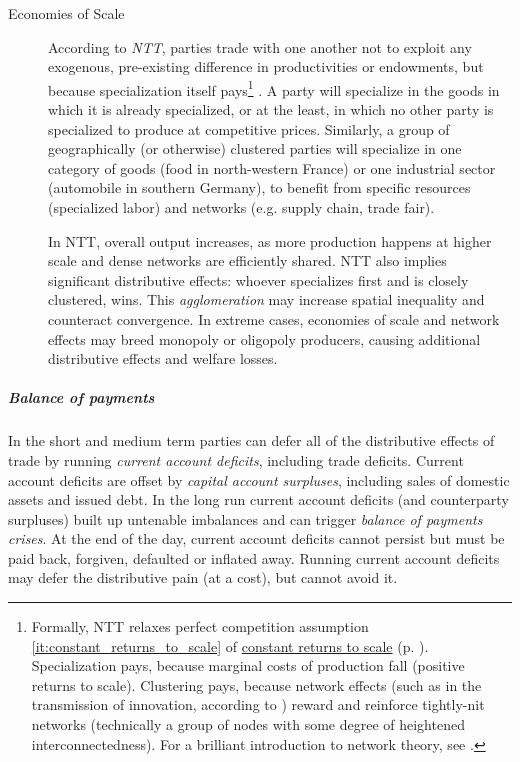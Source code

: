 \begin{description}
	\item[Economies of Scale] \label{it:NTT} According to \emph{\gls{NTT}}, parties trade with one another not to exploit any exogenous, pre-existing difference in productivities or endowments, but because specialization itself pays\footnote{
		Formally, \gls{NTT} relaxes perfect competition assumption \ref{it:constant_returns_to_scale} of \hyperref[it:constant_returns_to_scale]{constant returns to scale} (p. \pageref{it:constant_returns_to_scale}). Specialization pays, because marginal costs of production fall (positive returns to scale). Clustering pays, because network effects (such as in the transmission of innovation, according to \citealt{Bass1969}) reward and reinforce tightly-nit networks (technically a group of nodes with some degree of heightened interconnectedness). For a brilliant introduction to network theory, see \cite{Kleinberg-2009-oz}.} 
	\citep{Krugman-1980-aa}. A party will specialize in the goods in which it is already specialized, or at the least, in which no other party is specialized to produce at competitive prices. Similarly, a group of geographically (or otherwise) clustered parties will specialize in one category of goods (food in north-western France) or one industrial sector (automobile in southern Germany), to benefit from specific resources (specialized labor) and networks (e.g. supply chain, trade fair).

	In \gls{NTT}, overall output increases, as more production happens at higher scale and dense networks are efficiently shared. \gls{NTT} also implies significant distributive effects: whoever specializes first and is closely clustered, wins. This \emph{agglomeration} may increase spatial inequality and counteract convergence. %
	In extreme cases, economies of scale and network effects may breed monopoly or oligopoly producers, causing additional distributive effects and welfare losses.
\end{description}

\subparagraph{Balance of payments}
In the short and medium term parties can defer all of the distributive effects of trade by running \emph{current account deficits}, including trade deficits. Current account deficits are offset by \emph{capital account surpluses}, including sales of domestic assets and issued debt. In the long run current account deficits (and counterparty surpluses) built up untenable imbalances and can trigger \emph{balance of payments crises}. At the end of the day, current account deficits cannot persist but must be paid back, forgiven, defaulted or inflated away. Running current account deficits may defer the distributive pain (at a cost), but cannot avoid it.

